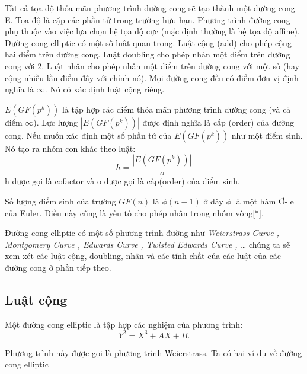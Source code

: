 \documentclass[a4paper,12pt]{report}
\begin{document}
Tất cả tọa độ thỏa mãn phương trình đường cong sẽ tạo thành một đường cong E. Tọa độ là cặp các phần tử trong trường hữu hạn. Phương trình đường cong phụ thuộc vào việc lựa chọn hệ tọa độ cực (mặc định thường là hệ tọa độ affine). Đường cong elliptic có một số luât quan trong. Luật cộng (add) cho phép cộng hai điểm trên đường cong. Luật doubling cho phép nhân một điểm trên đường cong với 2. Luật nhân cho phép nhân một điểm trên đường cong với một số (hay cộng nhiều lần điểm đấy với chính nó). Mọi đường cong đều có điểm đơn vị định nghĩa là $\infty$. Nó có xác định luật cộng riêng.

$E(GF(p^k))$ là tập hợp các điểm thỏa mãn phương trình đường cong (và cả điểm $\infty$). Lực lượng $|E(GF(p^k))|$ được định nghĩa là cấp (order) của đường cong. Nếu muốn xác định một số phần tử của 
$E(GF(p^k))$ như một điểm sinh. Nó tạo ra nhóm con khác theo luật:
\begin{displaymath}
h = \frac{|E(GF(p^k))|}{o}
\end{displaymath}
h được gọi là cofactor và o được gọi là cấp(order) của điểm sinh.

Số lượng điểm sinh của trường $GF(n)$ là $\phi (n - 1)$ ở đây $\phi$ là một hàm Ơ-le của Euler. Điều này cũng là yếu tố cho phép nhân trong nhóm vòng[*].

Đường cong elliptic có một số phương trình đường như \textit{Weierstrass Curve , Montgomery Curve , Edwards Curve , Twisted Edwards Curve , \ldots } chúng ta sẽ xem xét các luật cộng, doubling, nhân và các tính chất của các luật của các đường cong ở phần tiếp theo.
\subsection*{Luật cộng}
Một đường cong elliptic là tập hợp các nghiệm của phương trình:
\begin{displaymath}
Y^2 = X^3 + AX + B.
\end{displaymath}

Phương trình này được gọi là phương trình Weierstrass. Ta có hai ví dụ về đường cong elliptic
\end{document}
